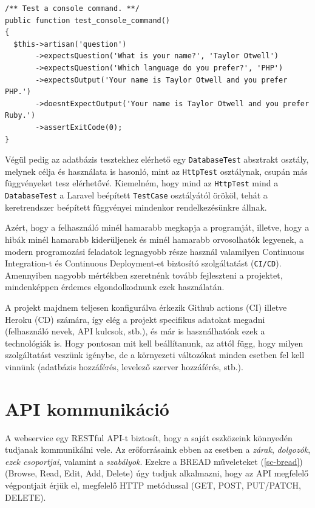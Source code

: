 \documentclass[a4paper,12pt]{thesis-ekf}
\theoremstyle{definition}
\begin{document}
\begin{lstlisting}[caption={A fenti parancs tesztel\'ese},captionpos=b]
/** Test a console command. **/
public function test_console_command()
{
  $this->artisan('question')
       ->expectsQuestion('What is your name?', 'Taylor Otwell')
       ->expectsQuestion('Which language do you prefer?', 'PHP')
       ->expectsOutput('Your name is Taylor Otwell and you prefer PHP.')
       ->doesntExpectOutput('Your name is Taylor Otwell and you prefer Ruby.')
       ->assertExitCode(0);
}
\end{lstlisting}

		Végül pedig az adatbázis tesztekhez elérhető egy \verb|DatabaseTest| absztrakt osztály, melynek célja és használata is hasonló, mint az \verb|HttpTest| osztálynak, csupán más függvényeket tesz elérhetővé. Kiemelném, hogy mind az \verb|HttpTest| mind a \verb|DatabaseTest| a Laravel beépített \verb|TestCase| osztályától örököl, tehát a keretrendszer beépített függvényei mindenkor rendelkezésünkre állnak.
		
		Azért, hogy a felhasználó minél hamarabb megkapja a programját, illetve, hogy a hibák minél hamarabb kiderüljenek és minél hamarabb orvosolhatók legyenek, a modern programozási feladatok legnagyobb része használ valamilyen Continuous Integration-t és Continuous Deployment-et biztosító szolgáltatást (\texttt{CI/CD}). Amennyiben nagyobb mértékben szeretnénk tovább fejleszteni a projektet, mindenképpen érdemes elgondolkodnunk ezek használatán.\cite{ci-cd}
		
		A projekt majdnem teljesen konfigurálva érkezik Github actions (CI) illetve Heroku (CD) számára, így elég a projekt specifikus adatokat megadni (felhasználó nevek, API kulcsok, stb.), és már is használhatóak ezek a technológiák is. Hogy pontosan mit kell beállítanunk, az attól függ, hogy milyen szolgáltatást veszünk igénybe, de a környezeti változókat minden esetben fel kell vinnünk (adatbázis hozzáférés, levelező szerver hozzáférés, stb.).
		
	\chapter{API kommunikáció}
		A webservice egy RESTful API-t biztosít, hogy a saját eszközeink könnyedén tudjanak kommunikálni vele. Az erőforrásaink ebben az esetben a \emph{zárak}, \emph{dolgozók}, \emph{ezek csoportjai}, valamint a \emph{szabályok}. Ezekre a BREAD műveleteket (\ref{sc-bread}) (Browse, Read, Edit, Add, Delete) úgy tudjuk alkalmazni, hogy az API megfelelő végpontjait érjük el, megfelelő HTTP metódussal (GET, POST, PUT/PATCH, DELETE).\cite{rest-api}
		
\end{document}
